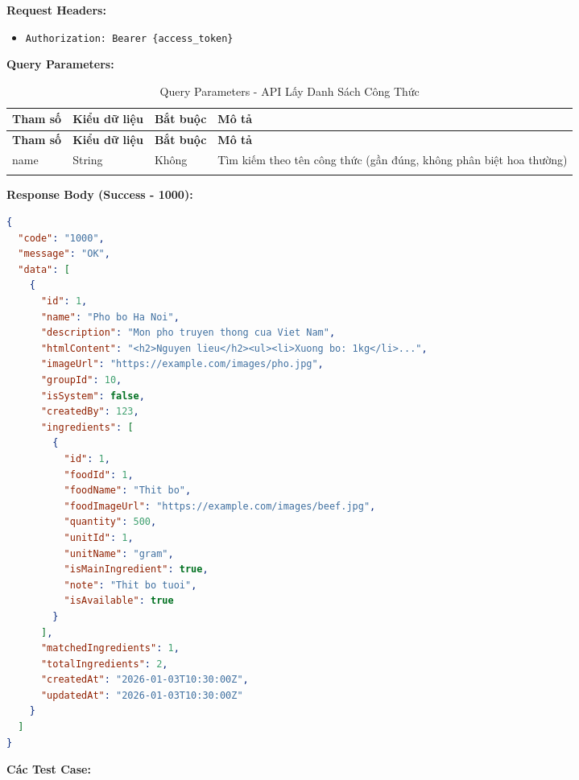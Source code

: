 \textbf{Request Headers:}
\begin{itemize}
    \item \texttt{Authorization: Bearer \{access\_token\}}
\end{itemize}

\textbf{Query Parameters:}

\small
\begin{longtable}{|>{\raggedright\arraybackslash}p{3cm}|>{\raggedright\arraybackslash}p{2.5cm}|>{\raggedright\arraybackslash}p{2cm}|>{\raggedright\arraybackslash}p{6cm}|}
\hline
\textbf{Tham số} & \textbf{Kiểu dữ liệu} & \textbf{Bắt buộc} & \textbf{Mô tả} \\
\hline
\endfirsthead
\hline
\textbf{Tham số} & \textbf{Kiểu dữ liệu} & \textbf{Bắt buộc} & \textbf{Mô tả} \\
\hline
\endhead
name & String & Không & Tìm kiếm theo tên công thức (gần đúng, không phân biệt hoa thường) \\
\hline
\caption{Query Parameters - API Lấy Danh Sách Công Thức}
\end{longtable}

\textbf{Response Body (Success - 1000):}

\begin{lstlisting}[language=json, caption=Response thanh cong API 4.2]
{
  "code": "1000",
  "message": "OK",
  "data": [
    {
      "id": 1,
      "name": "Pho bo Ha Noi",
      "description": "Mon pho truyen thong cua Viet Nam",
      "htmlContent": "<h2>Nguyen lieu</h2><ul><li>Xuong bo: 1kg</li>...",
      "imageUrl": "https://example.com/images/pho.jpg",
      "groupId": 10,
      "isSystem": false,
      "createdBy": 123,
      "ingredients": [
        {
          "id": 1,
          "foodId": 1,
          "foodName": "Thit bo",
          "foodImageUrl": "https://example.com/images/beef.jpg",
          "quantity": 500,
          "unitId": 1,
          "unitName": "gram",
          "isMainIngredient": true,
          "note": "Thit bo tuoi",
          "isAvailable": true
        }
      ],
      "matchedIngredients": 1,
      "totalIngredients": 2,
      "createdAt": "2026-01-03T10:30:00Z",
      "updatedAt": "2026-01-03T10:30:00Z"
    }
  ]
}
\end{lstlisting}

\textbf{Các Test Case:}

